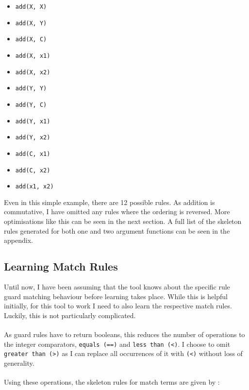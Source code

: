 \begin{multicols}{2}
\begin{itemize}
\item \lstinline{add(X, X)}
\item \lstinline{add(X, Y)}
\item \lstinline{add(X, C)}
\item \lstinline{add(X, x1)}
\item \lstinline{add(X, x2)}
\item \lstinline{add(Y, Y)}
\item \lstinline{add(Y, C)}
\item \lstinline{add(Y, x1)}
\item \lstinline{add(Y, x2)}
\item \lstinline{add(C, x1)}
\item \lstinline{add(C, x2)}
\item \lstinline{add(x1, x2)}
\end{itemize}
\end{multicols}

Even in this simple example, there are 12 possible rules. As addition is commutative, I have omitted any rules where the ordering is reversed. More optimisations like this can be seen in the next section.
A full list of the skeleton rules generated for both one and two argument functions can be seen in the appendix.

\subsection{Learning Match Rules}
Until now, I have been assuming that the tool knows about the specific rule guard matching behaviour before learning takes place. While this is helpful initially, for this tool to work I need to also learn the respective match rules. Luckily, this is not particularly complicated. \\ \\
As guard rules have to return booleans, this reduces the number of operations to the integer comparators, \lstinline{equals (==)} and \lstinline{less than (<)}. I choose to omit \lstinline{greater than (>)} as I can replace all occurrences of it with \lstinline{(<)} without loss of generality.\\ \\
Using these operations, the skeleton rules for match terms are given by : \\

